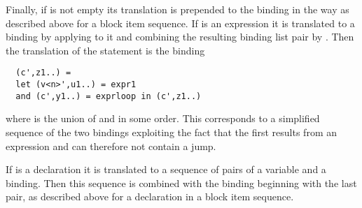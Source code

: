 Finally, if  is not empty its translation is prepended to the binding  in the way as described 
above for a block item sequence. If  is an expression it is translated to a binding  by 
applying  to it and 
combining the resulting binding list pair by . Then the translation of the  statement is the binding
\begin{verbatim}
  (c',z1..) = 
  let (v<n>',u1..) = expr1
  and (c',y1..) = exprloop in (c',z1..)
\end{verbatim}
where  is the union of  and  in some order. This corresponds to a simplified sequence of the two 
bindings exploiting the fact that the first results from an expression and can therefore not contain a jump.

If  is a declaration it is translated to a sequence of pairs of a variable and a binding. Then this sequence is combined
with the binding  beginning with the last pair, as described above for a declaration in a block item
sequence.

